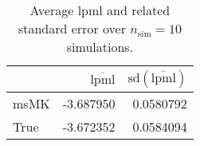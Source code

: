 \begin{table}[H]

\caption{Average lpml and related standard error over $n_{\text{sim}} = 10$ simulations.}
\centering
\begin{tabular}[t]{lrr}
\toprule
  & $\overbar{\text{lpml}}$ & $\text{sd}(\overbar{\text{lpml}})$\\
\midrule
msMK & -3.687950 & 0.0580792\\
True & -3.672352 & 0.0584094\\
\bottomrule
\end{tabular}
\end{table}